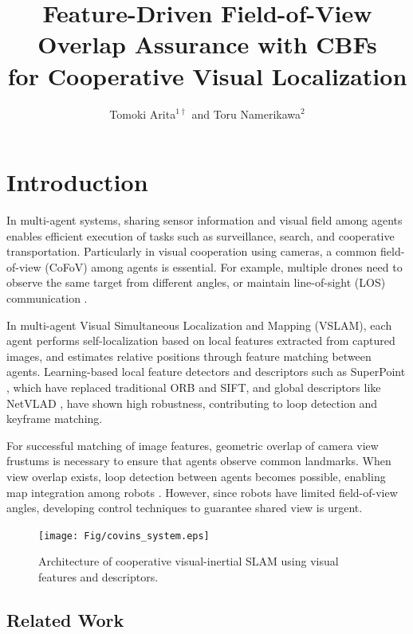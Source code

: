 \documentclass[fleqn,10pt,twocolumn]{SICE_FES25}
\title{Feature-Driven Field-of-View Overlap Assurance with CBFs \\ for Cooperative Visual Localization}
\author{Tomoki Arita${}^{1\dagger}$ and Toru Namerikawa${}^{2}$}
\theoremstyle{definition}
\theoremstyle{plain}
\begin{document}
\maketitle


\section{Introduction}

In multi-agent systems, sharing sensor information and visual field among agents enables efficient execution of tasks such as surveillance, search, and cooperative transportation. Particularly in visual cooperation using cameras, a common field-of-view (CoFoV) among agents is essential. For example, multiple drones need to observe the same target from different angles, or maintain line-of-sight (LOS) communication \cite{ref1}.

In multi-agent Visual Simultaneous Localization and Mapping (VSLAM), each agent performs self-localization based on local features extracted from captured images, and estimates relative positions through feature matching between agents. Learning-based local feature detectors and descriptors such as SuperPoint \cite{ref2}, which have replaced traditional ORB and SIFT, and global descriptors like NetVLAD \cite{ref3}, have shown high robustness, contributing to loop detection and keyframe matching.

For successful matching of image features, geometric overlap of camera view frustums is necessary to ensure that agents observe common landmarks. When view overlap exists, loop detection between agents becomes possible, enabling map integration among robots \cite{ref4}. However, since robots have limited field-of-view angles, developing control techniques to guarantee shared view is urgent.

\begin{figure}[ht]
\begin{center}
\texttt{[image: Fig/covins\_system.eps]}
\caption{\label{fig:covins} Architecture of cooperative visual-inertial SLAM using visual features and descriptors.}
\vspace{-6mm}
\end{center}
\end{figure}

\subsection{Related Work}
\end{document}
